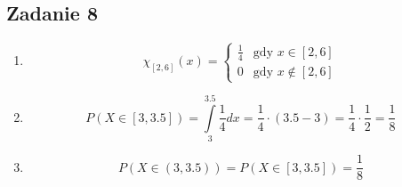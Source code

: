 \subsection{Zadanie 8}

\begin{enumerate}[label=(\alph*)]
\item
$$
\chi_{[2,6]}(x) = \left\{ \begin{array}{ll}
\frac{1}{4} & \textrm{gdy $x \in [2,6]$}\\
0 & \textrm{gdy $x \notin [2,6]$}
\end{array} \right.
$$
\item
$$
P(X \in [3, 3.5]) = \int\limits_{3}^{3.5} \frac{1}{4} dx = \frac{1}{4}\cdot (3.5 - 3) = \frac{1}{4}\cdot \frac{1}{2} = \frac{1}{8}
$$
\item
$$
P(X \in (3, 3.5)) = P(X \in [3, 3.5]) = \frac{1}{8}
$$
\end{enumerate}
